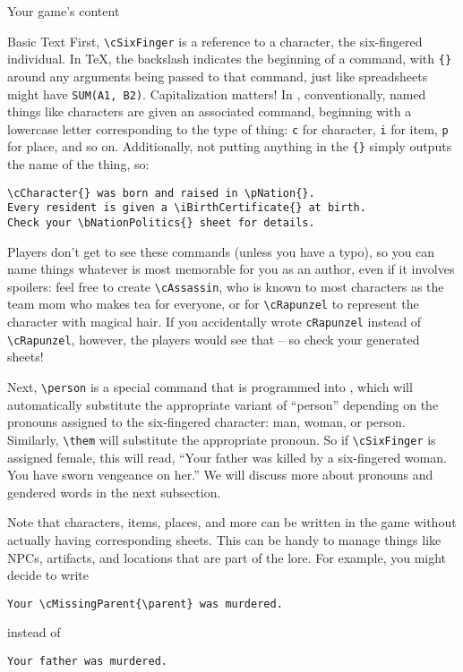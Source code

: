 \documentclass{article}
\begin{document}
\begin{section}{Your game's content}
\begin{subsection}{Basic \gametex{} Text}
First, \lstinline{\cSixFinger} is a reference to a character, the six-fingered individual.  In \TeX{}, the backslash indicates the beginning of a command, with \lstinline|{}| around any arguments being passed to that command, just like spreadsheets might have \texttt{SUM(A1, B2)}.  Capitalization matters!  In \gametex{}, conventionally, named things like characters are given an associated command, beginning with a lowercase letter corresponding to the type of thing: \lstinline{c} for character, \lstinline{i} for item, \lstinline{p} for place, and so on.  Additionally, not putting anything in the \lstinline|{}| simply outputs the name of the thing, so: 
\begin{verbatim}
\cCharacter{} was born and raised in \pNation{}.
Every resident is given a \iBirthCertificate{} at birth.
Check your \bNationPolitics{} sheet for details.
\end{verbatim}

Players don't get to see these commands (unless you have a typo), so you can name things whatever is most memorable for you as an author, even if it involves spoilers: feel free to create \lstinline|\cAssassin|, who is known to most characters as the team mom who makes tea for everyone, or for \lstinline{\cRapunzel} to represent the character with magical hair.  If you accidentally wrote \lstinline{cRapunzel} instead of \lstinline{\cRapunzel}, however, the players would see that -- so check your generated sheets!

Next, \lstinline{\person} is a special command that is programmed into \gametex{}, which will automatically substitute the appropriate variant of ``person'' depending on the pronouns assigned to the six-fingered character: man, woman, or person.  Similarly, \lstinline{\them} will substitute the appropriate pronoun.  So if \lstinline{\cSixFinger} is assigned female, this will read, ``Your father was killed by a six-fingered woman.  You have sworn vengeance on her.''  We will discuss more about pronouns and gendered words in the next subsection.

Note that characters, items, places, and more can be written in the game without actually having corresponding sheets.  This can be handy to manage things like NPCs, artifacts, and locations that are part of the lore.  For example, you might decide to write 
\begin{verbatim}
Your \cMissingParent{\parent} was murdered.
\end{verbatim}
instead of 
\begin{verbatim}
Your father was murdered.
\end{verbatim}


\end{subsection}
\end{section}
\end{document}

